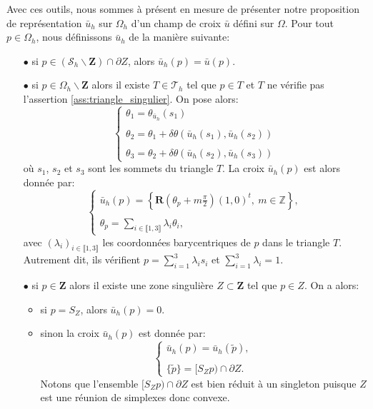 Avec ces outils, nous sommes à présent en mesure de présenter notre proposition de représentation $\bar{u}_h$ sur $\Omega_h$ d'un champ de croix $\bar{u}$ défini sur $\Omega$. Pour tout $p\in\Omega_h$, nous définissons $\bar{u}_h$ de la manière suivante:\\

\begin{itemize}
\item[$\bullet$] si $p\in(\mathcal{S}_h\backslash\mathbf{Z})\cap\partial Z$, alors $\bar{u}_h(p)=\bar{u}(p)$.\\%
\item[$\bullet$] si $p\in\Omega_h\backslash\mathbf{Z}$ alors il existe $T\in\mathcal{T}_h$ tel que $p\in T$ et $T$ ne vérifie pas l'assertion \ref{ass:triangle_singulier}. On pose alors:
$$
\left\{
\begin{array}{l}
\theta_1 = \theta_{\bar{u}_h}(s_1)\\\\
\theta_2 = \theta_1 + \delta\theta(\bar{u}_h(s_1),\bar{u}_h(s_2))\\\\
\theta_3 = \theta_2 + \delta\theta(\bar{u}_h(s_2),\bar{u}_h(s_3))
\end{array}
\right.
$$
où $s_1$, $s_2$ et $s_3$ sont les sommets du triangle $T$. La croix $\bar{u}_h(p)$ est alors donnée par:
$$
\left\{
\begin{array}{l}
\bar{u}_h(p)=\displaystyle\left\{\mathbf{R}\left(\theta_p+m\frac{\pi}{2}\right)(1,0)^t,~m\in\mathbb{Z}\right\},\\\\
\theta_p=\displaystyle\sum_{i\in\llbracket1, 3\rrbracket}\lambda_i\theta_i,
\end{array}
\right.
$$
avec $(\lambda_i)_{i\in\llbracket 1, 3\rrbracket}$ les coordonnées barycentriques de $p$ dans le triangle $T$. Autrement dit, ils vérifient $p=\sum_{i=1}^3\lambda_i s_i$ et $\sum_{i=1}^3\lambda_i=1$.\\
\item[$\bullet$] si $p\in\mathbf{Z}$ alors il existe une zone singulière $Z\subset\mathbf{Z}$ tel que $p\in Z$. On a alors:\\
\begin{itemize}
 \item si $p=S_Z$, alors $\bar{u}_h(p)=0$.\\
 \item sinon la croix $\bar{u}_h(p)$ est donnée par:
\begin{equation}
\label{eqn:etoilage}
\left\{
\begin{array}{l}
\bar{u}_h(p)=\bar{u}_h(\widetilde{p}),\\\\
\{\widetilde{p}\}=[S_Zp)\cap\partial Z.
\end{array}
\right.
\end{equation}
Notons que l'ensemble $[S_Zp)\cap\partial Z$ est bien réduit à un singleton puisque $Z$ est une réunion de simplexes donc convexe.\\
\end{itemize}
\end{itemize}

